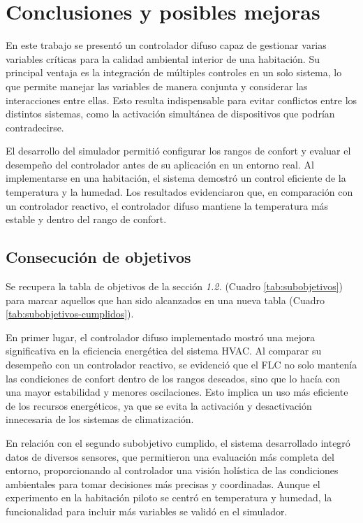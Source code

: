 \section{Conclusiones y posibles mejoras}

En este trabajo se presentó un controlador difuso capaz de gestionar varias variables críticas para la calidad ambiental interior de una habitación. Su principal ventaja es la integración de múltiples controles en un solo sistema, lo que permite manejar las variables de manera conjunta y considerar las interacciones entre ellas. Esto resulta indispensable para evitar conflictos entre los distintos sistemas, como la activación simultánea de dispositivos que podrían contradecirse.

El desarrollo del simulador permitió configurar los rangos de confort y evaluar el desempeño del controlador antes de su aplicación en un entorno real. Al implementarse en una habitación, el sistema demostró un control eficiente de la temperatura y la humedad. Los resultados evidenciaron que, en comparación con un controlador reactivo, el controlador difuso mantiene la temperatura más estable y dentro del rango de confort.

\subsection{Consecución de objetivos}

Se recupera la tabla de objetivos de la sección \textit{1.2.} (Cuadro \ref{tab:subobjetivos}) para marcar aquellos que han sido alcanzados en una nueva tabla (Cuadro \ref{tab:subobjetivos-cumplidos}).

En primer lugar, el controlador difuso implementado mostró una mejora significativa en la eficiencia energética del sistema HVAC. Al comparar su desempeño con un controlador reactivo, se evidenció que el FLC no solo mantenía las condiciones de confort dentro de los rangos deseados, sino que lo hacía con una mayor estabilidad y menores oscilaciones. Esto implica un uso más eficiente de los recursos energéticos, ya que se evita la activación y desactivación innecesaria de los sistemas de climatización.

En relación con el segundo subobjetivo cumplido, el sistema desarrollado integró datos de diversos sensores, que permitieron una evaluación más completa del entorno, proporcionando al controlador una visión holística de las condiciones ambientales para tomar decisiones más precisas y coordinadas. Aunque el experimento en la habitación piloto se centró en temperatura y humedad, la funcionalidad para incluir más variables se validó en el simulador.

